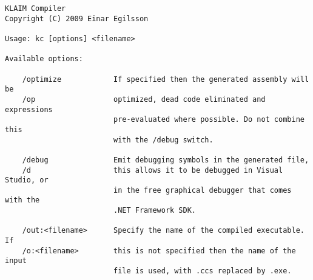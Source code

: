 	\begin{footnotesize}
	\begin{verbatim}
KLAIM Compiler
Copyright (C) 2009 Einar Egilsson

Usage: kc [options] <filename>

Available options:

    /optimize            If specified then the generated assembly will be
    /op                  optimized, dead code eliminated and expressions
                         pre-evaluated where possible. Do not combine this
                         with the /debug switch.
    
    /debug               Emit debugging symbols in the generated file,
    /d                   this allows it to be debugged in Visual Studio, or
                         in the free graphical debugger that comes with the
                         .NET Framework SDK.

    /out:<filename>      Specify the name of the compiled executable. If 
    /o:<filename>        this is not specified then the name of the input
                         file is used, with .ccs replaced by .exe.

	\end{verbatim}
	\end{footnotesize}
